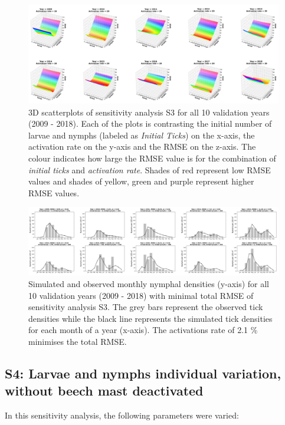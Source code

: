 \documentclass[a4paper, 11pt]{scrartcl}
\begin{document}
\begin{figure}[h!]
\centering
\includegraphics[width=\linewidth]{figures/independent_initial_ticks_with_beech_error.png}
\caption{3D scatterplots of sensitivity analysis S3 for all 10 validation years (2009 - 2018). Each of the plots is contrasting the initial number of larvae and nymphs
(labeled as \textit{Initial Ticks}) on the x-axis, the activation rate on the y-axis and the RMSE on the z-axis. The colour indicates how large the RMSE value is for the
combination of \textit{initial ticks} and \textit{activation rate}. Shades of red represent low RMSE values and shades of yellow, green and purple represent higher RMSE values.}
\label{fig:independent_initial_ticks_with_beech_error}
\end{figure}

\begin{figure}[h!]
\centering
\includegraphics[width=\linewidth]{figures/independent_initial_ticks_with_beech.png}
\caption{Simulated and observed monthly nymphal densities (y-axis) for all 10 validation years (2009 - 2018) with minimal total RMSE of sensitivity analysis S3. The grey bars
represent the observed tick densities while the black line represents the simulated tick densities for each month of a year (x-axis). The activations rate of 2.1 \% minimises
the total RMSE.}
\label{fig:independent_initial_ticks_with_beech}
\end{figure}



\newpage
\subsection{S4: Larvae and nymphs individual variation, without beech mast deactivated}
In this sensitivity analysis, the following parameters were varied:
\end{document}
